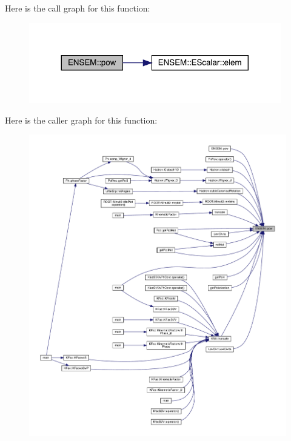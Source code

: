 Here is the call graph for this function\+:
\nopagebreak
\begin{figure}[H]
\begin{center}
\leavevmode
\includegraphics[width=311pt]{d4/dca/group__escalar_gaa3f8d5129f1ded089d42af89bd94827d_cgraph}
\end{center}
\end{figure}
Here is the caller graph for this function\+:
\nopagebreak
\begin{figure}[H]
\begin{center}
\leavevmode
\includegraphics[width=350pt]{d4/dca/group__escalar_gaa3f8d5129f1ded089d42af89bd94827d_icgraph}
\end{center}
\end{figure}
\mbox{\label{group__escalar_gaba7571beee718548316367ab8d623e70}} 
